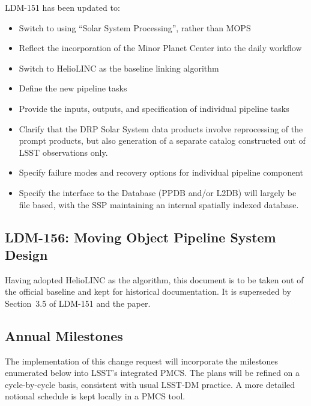 \documentclass[DM,authoryear,toc,lsstdraft]{lsstdoc}
\begin{document}
LDM-151 has been updated to:
%
\begin{itemize}
	\item Switch to using ``Solar System Processing'', rather than MOPS
	\item Reflect the incorporation of the Minor Planet Center into the daily workflow
	\item Switch to HelioLINC as the baseline linking algorithm
	\item Define the new pipeline tasks
	\item Provide the inputs, outputs, and specification of individual pipeline tasks
	\item Clarify that the DRP Solar System data products involve reprocessing of the prompt products, but also generation of a separate catalog constructed out of LSST observations only.
	\item Specify failure modes and recovery options for individual pipeline component
	\item Specify the interface to the Database (PPDB and/or L2DB) will largely be file based, with the SSP maintaining an internal spatially indexed database.
\end{itemize}

\subsection{LDM-156: Moving Object Pipeline System Design}

Having adopted HelioLINC as the algorithm, this document is to be taken out of the official baseline and kept for historical documentation. It is superseded by Section~3.5 of LDM-151 and the \cite{2018AJ....156..135H} paper.

\subsection{Annual Milestones}

The implementation of this change request will incorporate the milestones enumerated below into LSST's integrated PMCS. The plans will be refined on a cycle-by-cycle basis, consistent with usual LSST-DM practice. A more detailed notional schedule is kept locally in a PMCS tool.
\end{document}
